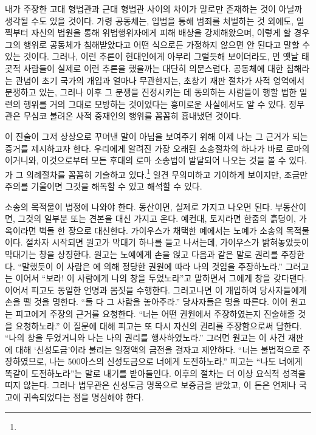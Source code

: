 내가 주장한 고대 형법관과 근대 형법관 사이의 차이가
말로만 존재하는 것이 아닐까 생각될 수도 있을 것이다.
가령 공동체는,
입법을 통해 범죄를 처벌하는 것 외에도,
일찍부터
자신의 법원을 통해
위법행위자에게 피해 배상을
강제해왔으며,
이렇게 할 경우
그의 행위로 공동체가 침해받았다고
어떤 식으로든
가정하지 않으면 안 된다고
말할 수 있는 것이다.
그러나,
이런 추론이
현대인에게
아무리 그럴듯해 보이더라도,
먼 옛날 태곳적 사람들이
실제로
이런 추론을
했을까는 대단히 의문스럽다.
공동체에 대한 침해라는 관념이
초기 국가의 개입과
얼마나 무관한지는,
초창기 재판 절차가
사적 영역에서 분쟁하고 있는,
그러나 이후 그 분쟁을 진정시키는 데 동의하는
사람들이 행할 법한
일련의 행위를 거의 그대로 모방하는 것이었다는
흥미로운 사실에서도
알 수 있다.
정무관은 무심코 불려온 사적 중재인의 행위를 꼼꼼히 흉내냈던 것이다.

이 진술이 그저 상상으로 꾸며낸 말이 아님을 보여주기 위해
이제 나는 그 근거가 되는 증거를 제시하고자 한다.
우리에게 알려진 가장 오래된 소송절차의 하나가
바로 로마의
이거니와,
이것으로부터 모든 후대의 로마 소송법이 발달되어 나오는 것을 볼 수 있다.
가 그 의례절차를 꼼꼼히 기술하고 있다.\footnote{%
   }
일견 무의미하고 기이하게 보이지만,
조금만 주의를 기울이면 그것을 해독할 수 있고 해석할 수 있다.

소송의 목적물이 법정에 나와야 한다.
동산이면, 실제로 가지고 나오면 된다.
부동산이면, 그것의 일부분 또는 견본을 대신 가지고 온다.
예컨대, 토지라면 한줌의 흙덩이, 가옥이라면 벽돌 한 장으로 대신한다.
가이우스가 채택한 예에서는 노예가 소송의 목적물이다.
절차자 시작되면 원고가 막대기 하나를 들고 나서는데,
가이우스가 밝혀놓았듯이 막대기는 창을 상징한다.
원고는 노예에게 손을 얹고 다음과 같은 말로 권리를 주장한다.
``말했듯이
이 사람은 에 의해 정당한 권원에 따라 나의 것임을
주장하노라.''
그러고는 이어서 ``보라! 이 사람에게 나의 창을
두었노라''고 말하면서
그에게 창을 갖다댄다.
이어서 피고도 동일한 언명과 몸짓을 수행한다.
그러고나면 이 개입하여
당사자들에게 손을 뗄 것을 명한다.
``둘 다 그 사람을 놓아주라.''
당사자들은 명을 따른다.
이어 원고는 피고에게 주장의 근거를 요청한다.
``너는 어떤 권원에서 주장하였는지 진술해줄 것을
요청하노라.''
이 질문에 대해 피고는 또 다시 자신의 권리를 주장함으로써 답한다.
``나의 창을 두었거니와 나는 나의 권리를 행사하였노라.''
그러면 원고는 이 사건 재판에 대해
`신성도금'이라 불리는 일정액의 금전을 걸자고 제안하다.
``너는 불법적으로 주장하였므로,
나는 500아스의 신성도금으로 너에게
도전하노라.''
피고는 ``나도 너에게 똑같이 도전하노라''는 말로
내기를 받아들인다.
이후의 절차는 더 이상 요식적 성격을 띠지 않는다.
그러나 법무관은 신성도금 명목으로 보증금을 받았고,
이 돈은 언제나 국고에 귀속되었다는 점을 명심해야 한다.


